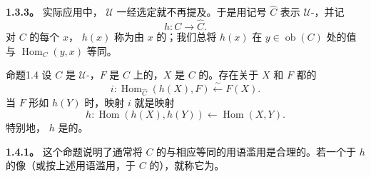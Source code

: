 \textbf{1.3.3。} 实际应用中， $\mathcal U$ 一经选定就不再提及。于是用记号 $\widehat C$ 表示 $\mathcal U$-，并记
\[h:C\longrightarrow\widehat C.\]
对 $C$ 的每个 $x$， $h(x)$ 称为由 $x$ 的；我们总将 $h(x)$ 在 $y\in\operatorname{ob}(C)$ 处的值与 $\operatorname{Hom}_C(y,x)$ 等同。
\begin{SGAresult}{命题}{1.4}
设 $C$ 是 $\mathcal U$-，$F$ 是 $C$ 上的，$X$ 是 $C$ 的。存在关于 $X$ 和 $F$ 都的
\[i:\operatorname{Hom}_{\widehat C}(h(X),F)\xleftarrow{\sim}F(X).\]
当 $F$ 形如 $h(Y)$ 时，映射 $i$ 就是映射
\[h:\operatorname{Hom}(h(X),h(Y))\longleftarrow\operatorname{Hom}(X,Y).\]
特别地， $h$ 是的。
\end{SGAresult}
\textbf{1.4.1。} 这个命题说明了通常将 $C$ 的与相应等同的用语滥用是合理的。若一个于 $h$ 的像（或按上述用语滥用，于 $C$ 的），就称它为。

